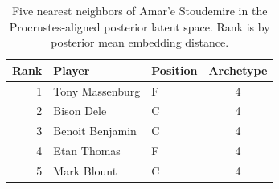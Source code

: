 \begin{table}[htbp]
  \centering\small
  \begin{tabular}{rllc}
    \toprule
    Rank & Player & Position & Archetype \\
    \midrule
    1 & Tony Massenburg & F & 4 \\
    2 & Bison Dele & C & 4 \\
    3 & Benoit Benjamin & C & 4 \\
    4 & Etan Thomas & F & 4 \\
    5 & Mark Blount & C & 4 \\
    \bottomrule
  \end{tabular}
  \caption{Five nearest neighbors of Amar'e Stoudemire in the Procrustes-aligned posterior latent space. Rank is by posterior mean embedding distance.}
  \label{tab:Amar_e_Stoudemire_neighbors}
\end{table}

